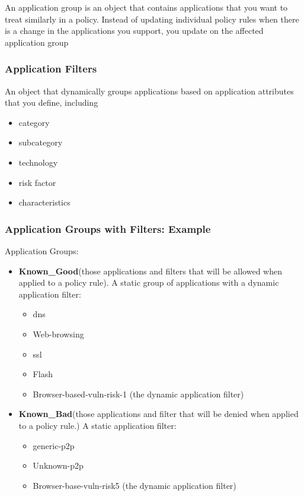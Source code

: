 An application group is an object that contains applications that you want to treat similarly in a policy.
Instead of updating individual policy rules when there is a change in the applications you support, you update on the affected application group

\subsubsection{Application Filters}
An object that dynamically groups applications based on application attributes that you define, including
    \begin{itemize}
        \item category
        \item subcategory
        \item technology
        \item risk factor
        \item characteristics
    \end{itemize}

\subsubsection{Application Groups with Filters:  Example}
Application Groups:
    \begin{itemize}
        \item \textbf{Known\_Good}(those applications and filters that will be allowed when applied to a policy rule).
        A static group of applications with a dynamic application filter:
            \begin{itemize}
                \item dns
                \item Web-browsing
                \item ssl
                \item Flash
                \item Browser-based-vuln-risk-1 (the dynamic application filter)
            \end{itemize}
        \item \textbf{Known\_Bad}(those applications and filter that will be denied when applied to a policy rule.) A static application filter:
            \begin{itemize}
                \item generic-p2p
                \item Unknown-p2p
                \item Browser-base-vuln-risk5 (the dynamic application filter)
            \end{itemize}
    \end{itemize}
    
